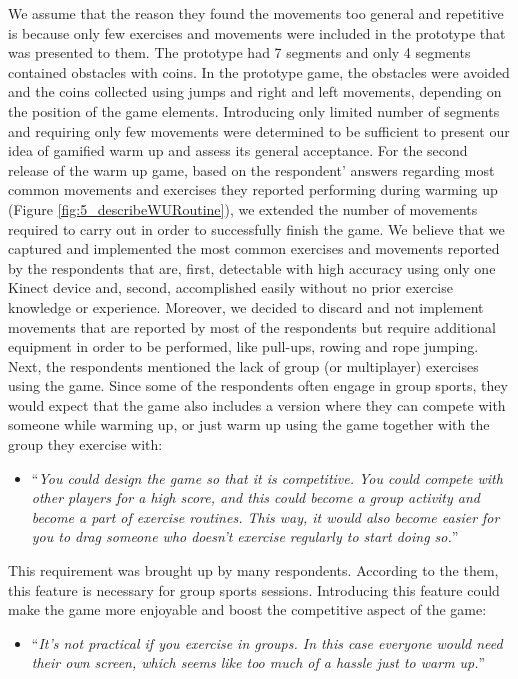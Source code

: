 We assume that the reason they found the movements too general and repetitive is because only few exercises and movements were included in the prototype that was presented to them. The prototype had 7 segments and only 4 segments contained obstacles with coins. In the prototype game, the obstacles were avoided and the coins collected using jumps and right and left movements, depending on the position of the game elements. Introducing only limited number of segments and requiring only few movements were determined to be sufficient to present our idea of gamified warm up and assess its general acceptance. For the second release of the warm up game, based on the respondent' answers regarding most common movements and exercises they reported performing during warming up (Figure \ref{fig:5_describeWURoutine}), we extended the number of movements required to carry out in order to successfully finish the game. We believe that we captured and implemented the most common exercises and movements reported by the respondents that are, first, detectable with high accuracy using only one Kinect device and, second, accomplished easily without no prior exercise knowledge or experience. Moreover, we decided to discard and not implement movements that are reported by most of the respondents but require additional equipment in order to be performed, like pull-ups, rowing and rope jumping. Next, the respondents mentioned the lack of group (or multiplayer) exercises using the game. Since some of the respondents often engage in group sports, they would expect that the game also includes a version where they can compete with someone while warming up, or just warm up using the game together with the group they exercise with:
\begin{itemize}
\item ``\textit{You could design the game so that it is competitive. You could compete with other players for a high score, and this could become a group activity and become a part of exercise routines. This way, it would also become easier for you to drag someone who doesn't exercise regularly to start doing so.}''
\end{itemize}
This requirement was brought up by many respondents. According to the them, this feature is necessary for group sports sessions. Introducing this feature could make the game more enjoyable and boost the competitive aspect of the game:
\begin{itemize}
\item ``\textit{It's not practical if you exercise in groups. In this case everyone would need their own screen, which seems like too much of a hassle just to warm up.}''
\end{itemize}
